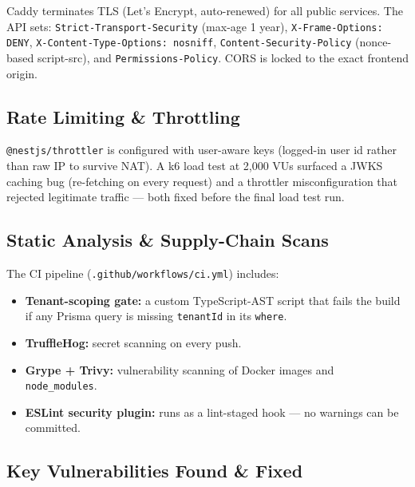 \documentclass[11pt,a4paper]{article}
\newcommand{\code}[1]{\texttt{\small #1}}
\begin{document}
Caddy terminates TLS (Let's Encrypt, auto-renewed) for all public services. The API
sets: \code{Strict-Transport-Security} (max-age 1 year), \code{X-Frame-Options: DENY},
\code{X-Content-Type-Options: nosniff}, \code{Content-Security-Policy} (nonce-based
script-src), and \code{Permissions-Policy}. CORS is locked to the exact frontend
origin.

\subsection{Rate Limiting \& Throttling}

\code{@nestjs/throttler} is configured with user-aware keys (logged-in user id rather
than raw IP to survive NAT). A k6 load test at 2{,}000 VUs surfaced a JWKS caching
bug (re-fetching on every request) and a throttler misconfiguration that rejected
legitimate traffic --- both fixed before the final load test run.

\subsection{Static Analysis \& Supply-Chain Scans}

The CI pipeline (\code{.github/workflows/ci.yml}) includes:
\begin{itemize}
  \item \textbf{Tenant-scoping gate:} a custom TypeScript-AST script that fails the
  build if any Prisma query is missing \code{tenantId} in its \code{where}.
  \item \textbf{TruffleHog:} secret scanning on every push.
  \item \textbf{Grype + Trivy:} vulnerability scanning of Docker images and
  \code{node\_modules}.
  \item \textbf{ESLint security plugin:} runs as a lint-staged hook --- no warnings
  can be committed.
\end{itemize}

\subsection{Key Vulnerabilities Found \& Fixed}
\end{document}
